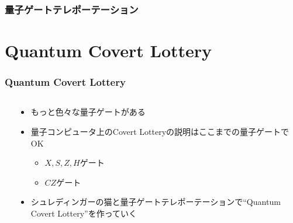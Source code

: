 \begin{frame}
  \frametitle{量子ゲートテレポーテーション}


  \pause

  \pause
\end{frame}

\section{Quantum Covert Lottery}

\begin{frame}
  \frametitle{Quantum Covert Lottery}

  \begin{columns}
    \begin{column}{0.55\textwidth}
      \begin{minipage}[t][.6\textheight][t]{\textwidth}
        \tableofcontents[currentsection]
      \end{minipage}
    \end{column}
    \begin{column}{0.45\textwidth}
      \begin{itemize}
        \item<+-> もっと色々な量子ゲートがある

        \item<+-> 量子コンピュータ上のCovert Lotteryの説明はここまでの量子ゲートでOK
        \begin{itemize}
          \item $X, S, Z, H$ゲート
          \item $CZ$ゲート
        \end{itemize}
        
        \item<+-> シュレディンガーの猫と量子ゲートテレポーテーションで``Quantum Covert Lottery''を作っていく
      \end{itemize}
    \end{column}
  \end{columns}
\end{frame}

\newcommand{\CovertTable}{%
  \begin{tabularx}{0.9\textwidth}{@{}| Y | Y |@{}}
    \hline
    希望 & 意味 \\ \hline
    $0$ & ボブの奢り \\ \hline
    $1$ & 割り勘 \\ \hline
  \end{tabularx}%
}

